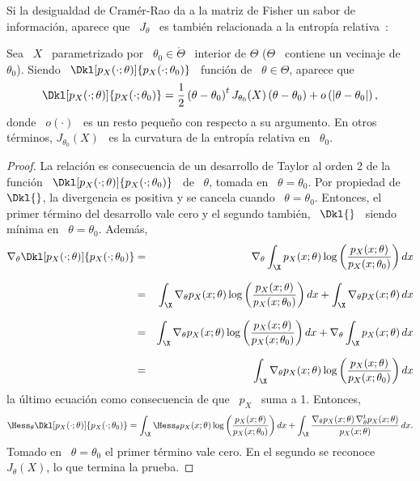 
\label{Sssec:SZ:FisherCurvatura}


Si  la  desigualdad de  Cram\'er-Rao  da  a la  matriz  de  Fisher  un sabor  de
informaci\'on,  aparece  que  \  $J_\theta$  \ es  tambi\'en  relacionada  a  la
entrop\'ia relativa~\cite{CovTho06, Fri04}:
%
\begin{teorema}
\label{Teo:SZ:FisherCurvatura}
%
  Sea \ $X$ \ parametrizado por \ $\theta_0 \in \mathring{\Theta}$ \ interior de
  $\Theta$  ($\Theta$  \  contiene  un  vecinaje de  \  $\theta_0$).   Siendo  \
  $\Dkl[p_X(\cdot;\theta)]{p_X(\cdot;\theta_0)}$  \ funci\'on  de \  $\theta \in
  \Theta$, aparece que
  \[
  \Dkl[p_X(\cdot;\theta)]{p_X(\cdot;\theta_0)}   =  \frac12   \left(   \theta  -
      \theta_0  \right)^t J_{\theta_0}(X)  \left(  \theta -  \theta_0 \right)  +
    o\left( | \theta - \theta_0 |\right),
  \]
  donde \  $o(\cdot)$ \ es un resto  peque\~no con respecto a  su argumento.  En
  otros  t\'erminos,  $J_{\theta_0}(X)$  \  es  la curvatura  de  la  entrop\'ia
  relativa en \ $\theta_0$.
\end{teorema}
%
\begin{proof}
  La relaci\'on  es consecuencia  de un desarrollo  de Taylor  al orden 2  de la
  funci\'on \  $\Dkl[p_X(\cdot;\theta)]{p_X(\cdot;\theta_0)}$ \ de  \ $\theta$,
  tomada en \  $\theta = \theta_0$. Por propiedad de  \ $\Dkl{}$, la divergencia
  es positiva  y se cancela cuando  \ $\theta = \theta_0$.   Entonces, el primer
  t\'ermino del desarrollo vale cero y el segundo tambi\'en, \ $\Dkl{}$ \ siendo
  m\'inima en \ $\theta = \theta_0$. Adem\'as,
  \begin{eqnarray*}
  \nabla_\theta \Dkl[p_X(\cdot;\theta)]{p_X(\cdot;\theta_0)} & =
  & \nabla_\theta \int_\X p_X(x;\theta) \log \left(
  \frac{p_X(x;\theta)}{p_X(x;\theta_0)} \right) dx\\[2.5mm]
  & = & \int_\X \nabla_\theta p_X(x;\theta) \log \left(
  \frac{p_X(x;\theta)}{p_X(x;\theta_0)} \right) dx + \int_\X \nabla_\theta
  p_X(x;\theta) \, dx\\[2.5mm]
  & = & \int_\X \nabla_\theta p_X(x;\theta) \log \left(
  \frac{p_X(x;\theta)}{p_X(x;\theta_0)} \right) dx + \nabla_\theta \int_\X
  p_X(x;\theta) \, dx\\[2.5mm]
  & = & \int_\X \nabla_\theta p_X(x;\theta) \log \left(
  \frac{p_X(x;\theta)}{p_X(x;\theta_0)} \right) dx
  \end{eqnarray*}
  la \'ultimo ecuaci\'on como consecuencia de que \ $p_X$ \ suma a 1.  Entonces,
  \[
  \Hess_\theta     \Dkl[p_X(\cdot;\theta)]{p_X(\cdot;\theta_0)}     =    \int_\X
  \Hess_\theta  p_X(x;\theta) \log  \left( \frac{p_X(x;\theta)}{p_X(x;\theta_0)}
  \right)  dx  + \int_\X  \frac{\nabla_\theta  p_X(x;\theta) \,  \nabla^t_\theta
    p_X(x;\theta)}{p_X(x;\theta)} \, dx.
  \]
  Tomado en \ $\theta = \theta_0$  el primer t\'ermino vale cero.  En el segundo
  se reconoce \ $J_\theta(X)$, lo que termina la prueba.
\end{proof}
